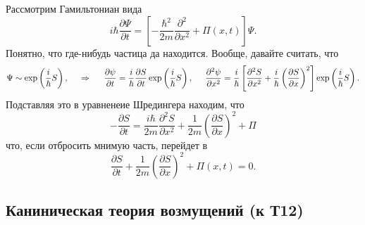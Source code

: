 Рассмотрим Гамильтониан вида
\begin{equation*}
    i \hbar \frac{\partial \Psi}{\partial t} = \left[
        - \frac{\hbar^2}{2m} \frac{\partial^2 }{\partial x^2} + \Pi(x, t)
    \right] \Psi.
\end{equation*}
Понятно, что где-нибудь частица да находится. Вообще, давайте считать, что
\begin{equation*}
    \Psi \sim \exp\left(\frac{i}{\hbar} S\right),
    \hspace{0.5cm} \Rightarrow \hspace{0.5cm}
    \frac{\partial \psi}{\partial t} = \frac{i}{\hbar} \frac{\partial S}{\partial t}  \exp\left(\frac{i}{\hbar} S\right),
    \hspace{5 mm}
    \frac{\partial^2 \psi}{\partial x^2} = \frac{i}{\hbar} \left[
        \frac{\partial^2 S}{\partial x^2} + \frac{i}{\hbar} \left(
            \frac{\partial S}{\partial x} 
        \right)^2
    \right] \exp\left(\frac{i}{\hbar} S\right).
\end{equation*}
Подставляя это в уравненеие Шредингера находим, что
\begin{equation*}
    - \frac{\partial S}{\partial t} = \frac{i \hbar}{2 m} \frac{\partial^2 S}{\partial x^2} + \frac{1}{2m} 
    \left(\frac{\partial S}{\partial x} \right)^2 + \Pi
\end{equation*}
что, если отбросить мнимую часть, перейдет в 
\begin{equation*}
    \frac{\partial S}{\partial t} + \frac{1}{2m} \left(
        \frac{\partial S}{\partial x} 
    \right)^2 + \Pi(x, t) = 0.
\end{equation*}



\subsection{Каниническая теория возмущений (к Т12)}

